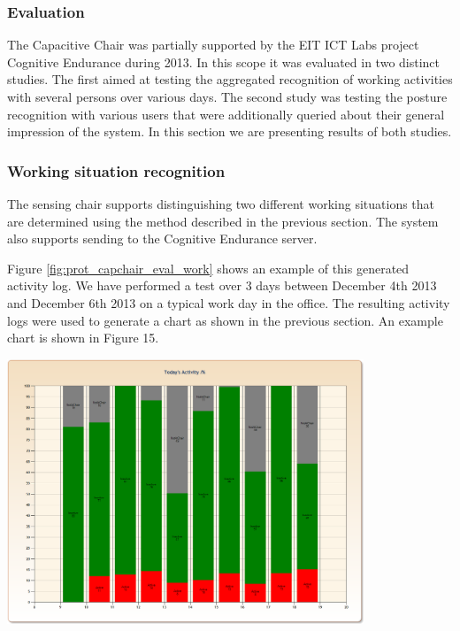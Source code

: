 \subsubsection{Evaluation}
The Capacitive Chair was partially supported by the EIT ICT Labs project Cognitive Endurance during 2013. In this scope it was evaluated in two distinct studies. The first aimed at testing the aggregated recognition of working activities with several persons over various days. The second study was testing the posture recognition with various users that were additionally queried about their general impression of the system. In this section we are presenting results of both studies.
\subsubsection*{Working situation recognition}
The sensing chair supports distinguishing two different working situations that are determined using the method described in the previous section. The system also supports sending to the Cognitive Endurance server.
 
Figure \ref{fig:prot_capchair_eval_work} shows an example of this generated activity log. We have performed a test over 3 days between December 4th 2013 and December 6th 2013 on a typical work day in the office. The resulting activity logs were used to generate a chart as shown in the previous section. An example chart is shown in Figure 15.

\begin{minipage}{\linewidth}
\centering
\includegraphics[width=0.8\textwidth]{images/prot_capchair_eval_work}
\label{fig:prot_capchair_eval_work}
\end{minipage}	

